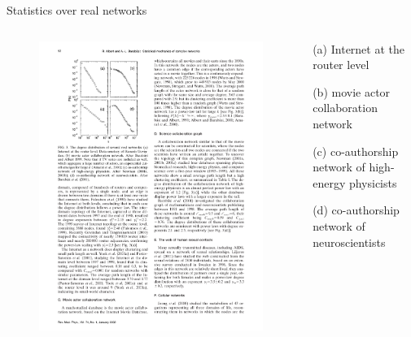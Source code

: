 \begin{frame}{Statistics over real networks}
\begin{columns}
\begin{column}{0.5\textwidth}
\begin{figure}
\includegraphics[width=\textwidth]{scalefree}
\end{figure}
\end{column}
\begin{column}{0.5\textwidth}
\BI
\item[(a)] Internet at the router level
\item[(b)] movie actor collaboration network
\item[(c)] co-authorship network of high-energy physicists
\item[(d)] co-authorship network of neuroscientists
\EI
\end{column}
\end{columns}

\end{frame}

